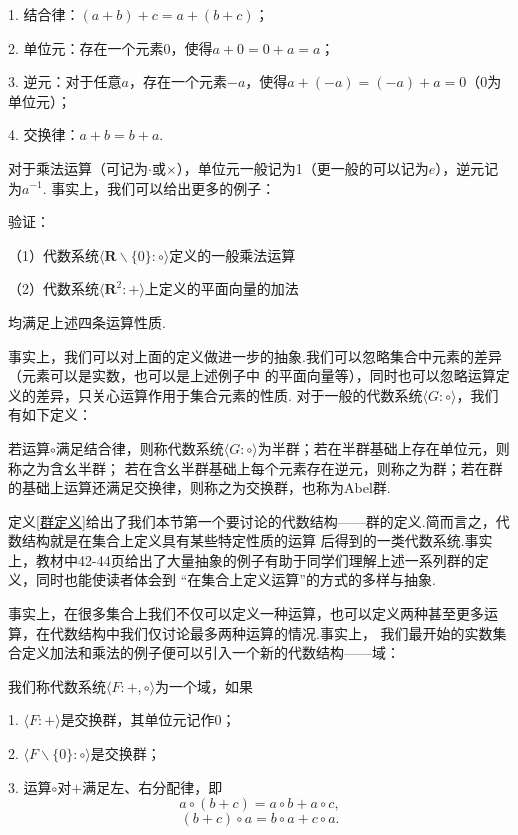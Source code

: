 	1. 结合律：$(a+b)+c=a+(b+c)$；
	
	2. 单位元：存在一个元素$0$，使得$a+0=0+a=a$；
	
	3. 逆元：对于任意$a$，存在一个元素$-a$，使得$a+(-a)=(-a)+a=0$（0为单位元）；
	
	4. 交换律：$a+b=b+a$.

对于乘法运算（可记为$\cdot$或$\times$），单位元一般记为1（更一般的可以记为$e$），逆元记为$a^{-1}$.
事实上，我们可以给出更多的例子：
\begin{example}
	验证：

	（1）代数系统$\langle \mathbf{R}\backslash\{0\}:\circ\rangle$定义的一般乘法运算

	（2）代数系统$\langle \mathbf{R}^2:+\rangle$上定义的平面向量的加法

	均满足上述四条运算性质.
\end{example}

事实上，我们可以对上面的定义做进一步的抽象.我们可以忽略集合中元素的差异（元素可以是实数，也可以是上述例子中
的平面向量等），同时也可以忽略运算定义的差异，只关心运算作用于集合元素的性质.
对于一般的代数系统$\langle G:\circ\rangle$，我们有如下定义：
\begin{definition}\label{群定义}
	若运算$\circ$满足结合律，则称代数系统$\langle G:\circ\rangle$为半群；若在半群基础上存在单位元，则称之为含幺半群；
	若在含幺半群基础上每个元素存在逆元，则称之为群；若在群的基础上运算还满足交换律，则称之为交换群，也称为Abel群.
\end{definition}

定义\ref{群定义}给出了我们本节第一个要讨论的代数结构——群的定义.简而言之，代数结构就是在集合上定义具有某些特定性质的运算
后得到的一类代数系统.事实上，教材中42-44页给出了大量抽象的例子有助于同学们理解上述一系列群的定义，同时也能使读者体会到
“在集合上定义运算”的方式的多样与抽象.

事实上，在很多集合上我们不仅可以定义一种运算，也可以定义两种甚至更多运算，在代数结构中我们仅讨论最多两种运算的情况.事实上，
我们最开始的实数集合定义加法和乘法的例子便可以引入一个新的代数结构——域：
\begin{definition}
	我们称代数系统$\langle F:+,\circ\rangle$为一个域，如果

	1. $\langle F:+\rangle$是交换群，其单位元记作0；
	
	2. $\langle F\backslash\{0\}:\circ\rangle$是交换群；
	
	3. 运算$\circ$对$+$满足左、右分配律，即
	$$a\circ(b+c)=a\circ b+a\circ c,$$
	$$(b+c)\circ a=b\circ a+c\circ a.$$
\end{definition}

